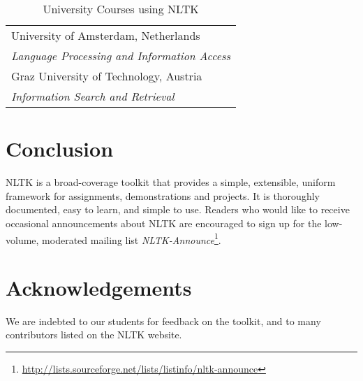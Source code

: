 \documentclass[11pt]{article}
\begin{document}
\begin{table}[bt]
\begin{boxedminipage}{\linewidth}
\begin{tabular}{l}
University of Amsterdam, Netherlands \\
\hspace{2ex}
\textit{Language Processing and Information Access} \\[.5ex]

Graz University of Technology, Austria \\
\hspace{2ex}
\textit{Information Search and Retrieval} \\[.5ex]

\end{tabular}
\caption{University Courses using NLTK}\label{tab:courses}
\end{boxedminipage}
\end{table}

\section{Conclusion}

NLTK is a broad-coverage toolkit that provides a simple, extensible,
uniform framework for assignments, demonstrations and projects.  It is
thoroughly documented, easy to learn, and simple to use.  Readers who
would like to receive occasional announcements about NLTK are
encouraged to sign up for the low-volume, moderated mailing list
\textit{NLTK-Announce}\footnote{\url{http://lists.sourceforge.net/lists/listinfo/nltk-announce}}.

\section{Acknowledgements}

We are indebted to our students for feedback on the toolkit, and to
many contributors listed on the NLTK website.



\end{document}
